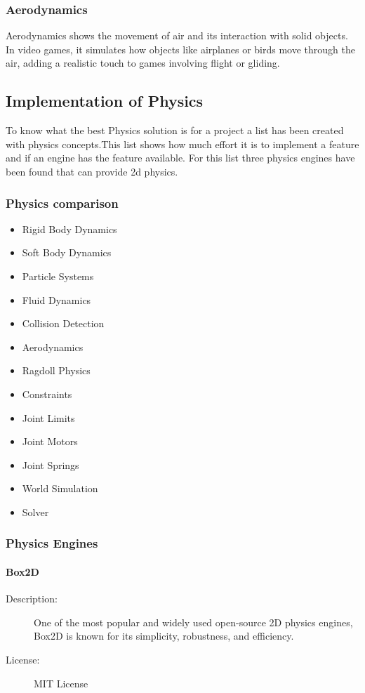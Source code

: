 \documentclass{projdoc}
\begin{document}
\subsubsection{Aerodynamics}
Aerodynamics shows the movement of air and its interaction with solid objects. In video games, it simulates how objects like airplanes or birds move through the air, adding a realistic touch to games involving flight or gliding.

\subsection{Implementation of Physics}

To know what the best Physics solution is for a project a list has been created with physics concepts.This list shows how much effort it is to implement a feature and if an engine has the feature available. For this list three physics engines have been found that can provide 2d physics.

\subsubsection{Physics comparison}

\begin{itemize}
    \item Rigid Body Dynamics
    \item Soft Body Dynamics
    \item Particle Systems
    \item Fluid Dynamics
    \item Collision Detection
    \item Aerodynamics
    \item Ragdoll Physics
    \item Constraints %
    \item Joint Limits %
    \item Joint Motors %
    \item Joint Springs %
    \item World Simulation %
    \item Solver %
\end{itemize}

\subsubsection{Physics Engines}

\paragraph{Box2D}
\begin{description}
	\item[Description:] One of the most popular and widely used open-source 2D physics engines, Box2D is known for its simplicity, robustness, and efficiency.
	\item[License:] MIT License
\end{description}
\end{document}

